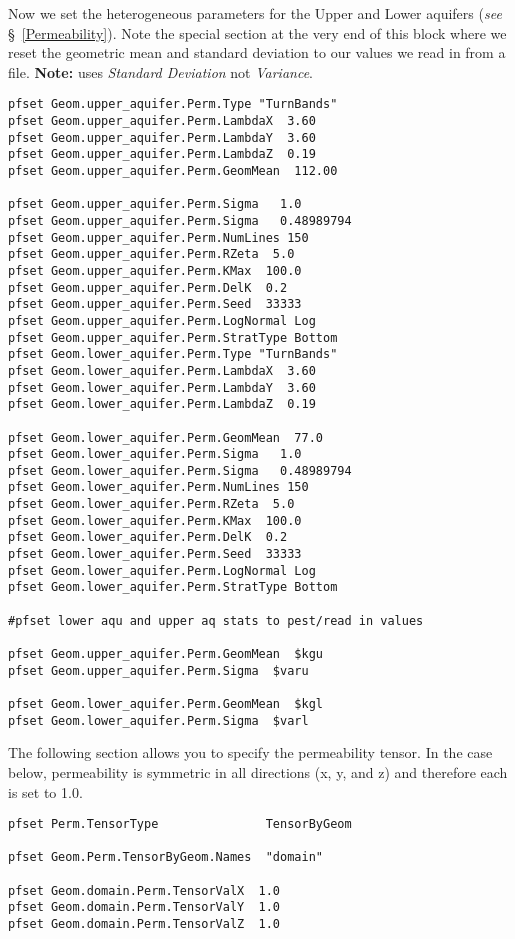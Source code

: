 Now we set the heterogeneous parameters for the Upper and Lower aquifers (\emph{see} \S~\ref{Permeability}).  
Note the special section at the very end of this block where we reset the geometric mean and standard 
deviation to our values we read in from a file.  {\bf Note:} \parflow{} uses {\em Standard Deviation} not {\em Variance}.

\begin{verbatim}
pfset Geom.upper_aquifer.Perm.Type "TurnBands"
pfset Geom.upper_aquifer.Perm.LambdaX  3.60
pfset Geom.upper_aquifer.Perm.LambdaY  3.60
pfset Geom.upper_aquifer.Perm.LambdaZ  0.19
pfset Geom.upper_aquifer.Perm.GeomMean  112.00

pfset Geom.upper_aquifer.Perm.Sigma   1.0
pfset Geom.upper_aquifer.Perm.Sigma   0.48989794
pfset Geom.upper_aquifer.Perm.NumLines 150
pfset Geom.upper_aquifer.Perm.RZeta  5.0
pfset Geom.upper_aquifer.Perm.KMax  100.0
pfset Geom.upper_aquifer.Perm.DelK  0.2
pfset Geom.upper_aquifer.Perm.Seed  33333
pfset Geom.upper_aquifer.Perm.LogNormal Log
pfset Geom.upper_aquifer.Perm.StratType Bottom
pfset Geom.lower_aquifer.Perm.Type "TurnBands"
pfset Geom.lower_aquifer.Perm.LambdaX  3.60
pfset Geom.lower_aquifer.Perm.LambdaY  3.60
pfset Geom.lower_aquifer.Perm.LambdaZ  0.19

pfset Geom.lower_aquifer.Perm.GeomMean  77.0
pfset Geom.lower_aquifer.Perm.Sigma   1.0
pfset Geom.lower_aquifer.Perm.Sigma   0.48989794
pfset Geom.lower_aquifer.Perm.NumLines 150
pfset Geom.lower_aquifer.Perm.RZeta  5.0
pfset Geom.lower_aquifer.Perm.KMax  100.0
pfset Geom.lower_aquifer.Perm.DelK  0.2
pfset Geom.lower_aquifer.Perm.Seed  33333
pfset Geom.lower_aquifer.Perm.LogNormal Log
pfset Geom.lower_aquifer.Perm.StratType Bottom

#pfset lower aqu and upper aq stats to pest/read in values

pfset Geom.upper_aquifer.Perm.GeomMean  $kgu
pfset Geom.upper_aquifer.Perm.Sigma  $varu

pfset Geom.lower_aquifer.Perm.GeomMean  $kgl
pfset Geom.lower_aquifer.Perm.Sigma  $varl
\end{verbatim}

The following section allows you to specify the permeability tensor.  
In the case below, permeability is symmetric in all directions (x, y, and z) and therefore each is set to 1.0.

\begin{verbatim}
pfset Perm.TensorType               TensorByGeom

pfset Geom.Perm.TensorByGeom.Names  "domain"

pfset Geom.domain.Perm.TensorValX  1.0
pfset Geom.domain.Perm.TensorValY  1.0
pfset Geom.domain.Perm.TensorValZ  1.0
\end{verbatim}

